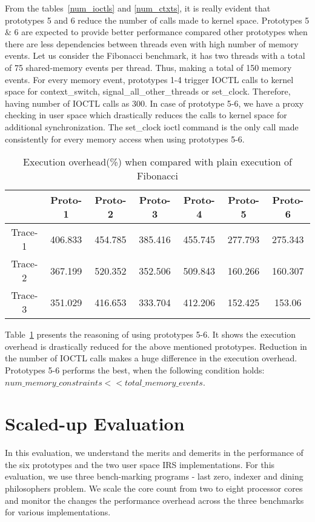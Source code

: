 From the tables~\ref{num_ioctls} and \ref{num_ctxts}, it is really evident that prototypes 5 and 6 reduce the number of calls made to kernel space. 
Prototypes 5 \& 6 are expected to provide better performance compared other prototypes when there are less dependencies between threads even with high number of memory events. 
Let us consider the Fibonacci benchmark, it has two threads with a total of 75 shared-memory events per thread. 
Thus, making a total of 150 memory events. 
For every memory event, prototypes 1-4 trigger IOCTL calls to kernel space for context\_switch, signal\_all\_other\_threads or set\_clock. 
Therefore, having number of IOCTL calls as 300. 
In case of prototype 5-6, we have a proxy checking in user space which drastically reduces the calls to kernel space for additional synchronization. 
The set\_clock ioctl command is the only call made consistently for every memory access when using prototypes 5-6.

\begin{table}[h]
\begin{center}
 \begin{tabular}{|c c c c c c c|} 
 \hline
 & Proto-1 & Proto-2 & Proto-3 & Proto-4 & Proto-5 & Proto-6\\ %
 \hline
 Trace-1 & 406.833 & 454.785 & 385.416 & 455.745 & 277.793 & 275.343 \\ 
 Trace-2 & 367.199 & 520.352 & 352.506 & 509.843 & 160.266 & 160.307 \\
 Trace-3 & 351.029 & 416.653 & 333.704 & 412.206 & 152.425 & 153.06\\
 \hline
\end{tabular}
\end{center}
\caption{Execution overhead(\%) when compared with plain execution of Fibonacci}
\label{fib_exec_over}
\end{table}

Table~\ref{fib_exec_over} presents the reasoning of using prototypes 5-6. 
It shows the execution overhead is drastically reduced for the above mentioned prototypes. 
Reduction in the number of IOCTL calls makes a huge difference in the execution overhead. 
Prototypes 5-6 performs the best, when the following condition holds:
$num\_memory\_constraints << total\_memory\_events$.

\section{Scaled-up Evaluation}

In this evaluation, we understand the merits and demerits in the performance of the six prototypes and the two user space IRS implementations. 
For this evaluation, we use three bench-marking programs - last zero, indexer and dining philosophers problem. 
We scale the core count from two to eight processor cores and monitor the changes the performance overhead across the three benchmarks for various implementations. 
